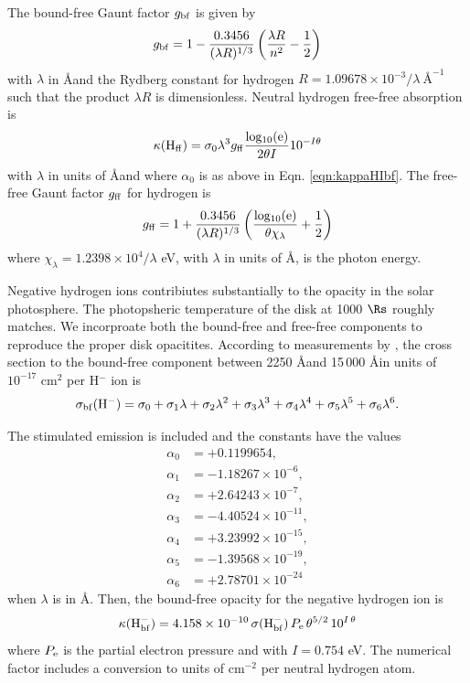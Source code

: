 The bound-free Gaunt factor $g_{\rm bf}$ is given by
\begin{equation}\label{eqn:gauntHIbf}
    g_{\rm bf} = 1 - \frac{0.3456}{(\lambda R)^{1/3}} \left( \frac{\lambda R}{n^2} - \frac{1}{2} \right)
\end{equation}
with $\lambda$ in \AA and the Rydberg constant for hydrogen $R = 1.09678 \times 10^{-3} / \lambda \ {\text{\AA}^{-1}}$ such that the product $\lambda R$ is dimensionless. Neutral hydrogen free-free absorption is
\begin{equation}\label{eqn:kappaHIff}
    \kappa({\rm H_{ff}}) = \sigma_0 \lambda^3 g_{\rm ff} \frac{\rm log_{10}(e)}{2\theta I} 10^{-I\theta}
\end{equation}
with $\lambda$ in units of \AA and where $\alpha_0$ is as above in Eqn. \ref{eqn:kappaHIbf}. The free-free Gaunt factor $g_{\rm ff}$ for hydrogen is
\begin{equation}
    g_{\rm ff} = 1 + \frac{0.3456}{(\lambda R)^{1/3}} \left( \frac{\rm log_{10}(e)}{\theta \chi_{\lambda}} + \frac{1}{2} \right)
\end{equation}
where $\chi_{\lambda} = 1.2398 \times 10^4 / \lambda$ eV, with $\lambda$ in units of \AA, is the photon energy.

Negative hydrogen ions contribiutes substantially to the opacity in the solar photosphere.
The photopsheric temperature of the \citet{SirkoGoodman03} disk at 1000 $\Rs$ roughly matches.
We incorproate both the bound-free and free-free components to reproduce the proper disk opacitites.
According to measurements by \citet{Wishart79}, the cross section to the bound-free component between 2250 \AA and 15\,000 \AA in units of $10^{-17}$ cm$^2$ per H$^-$ ion is
\begin{equation}
    \sigma_{\rm bf}(\rm H^-) = \sigma_0 + \sigma_1 \lambda + \sigma_2 \lambda^2 + \sigma_3 \lambda^3 + \sigma_4 \lambda^4 + \sigma_5 \lambda^5 + \sigma_6 \lambda^6.
\end{equation}

The stimulated emission is included and the constants have the values
\begin{align}
    \alpha_0 &= +0.1199654, \\
    \alpha_1 &= -1.18267 \times 10^{-6}, \\
    \alpha_2 &= +2.64243 \times 10^{-7}, \\
    \alpha_3 &= -4.40524 \times 10^{-11}, \\
    \alpha_4 &= +3.23992 \times 10^{-15}, \\
    \alpha_5 &= -1.39568 \times 10^{-19}, \\
    \alpha_6 &= +2.78701 \times 10^{-24}
\end{align}
when $\lambda$ is in \AA.
Then, the bound-free opacity for the negative hydrogen ion is
\begin{equation}
    \kappa({\rm H^-_{bf}}) = 4.158 \times 10^{-10} \, \sigma({\rm H^-_{bf}}) \, P_{\rm e} \, \theta^{5/2} \, 10^{I\, \theta} \\
\end{equation}
where $P_{\rm e}$ is the partial electron pressure and with $I = 0.754$ eV.
The numerical factor includes a conversion to units of cm$^{-2}$ per neutral hydrogen atom.

